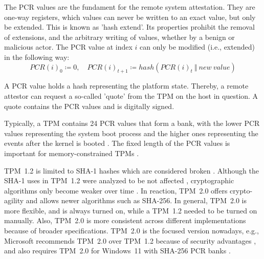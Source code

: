 The \ac{PCR} values are the fundament for the remote system attestation. They are one-way registers, which values can never be written to an exact value, but only be extended.
This is known as 'hash extend'.
Its properties prohibit the removal of extensions, and the arbitrary writing of values, whether by a benign or malicious actor.
The PCR value at index $i$ can only be modified (i.e., extended) in the following way:
\[ PCR(i)_0 \coloneqq 0,\quad PCR(i)_{t+1} \coloneqq hash(PCR(i)_t\ \Vert\ new\ value)\]

A PCR value holds a hash representing the platform state.
Thereby, a remote attestor can request a so-called 'quote' from the TPM on the host in question.
A quote contains the PCR values and is digitally signed.

Typically, a TPM contains 24 PCR values that form a bank, with the lower PCR values representing the system boot process and the higher ones representing the events after the kernel is booted \cite{Arthur2015}.
The fixed length of the \ac{PCR} values is important for memory-constrained TPMs \cite{Arthur2015}.

%


TPM~1.2 is limited to SHA-1 hashes which are considered broken \cite{cryptoeprint:2005/010, Wang2005, Stevens2017}. Although the SHA-1 uses in TPM~1.2 were analyzed to be not affected \cite{sha1tpm12}, cryptographic algorithms only become weaker over time \cite{Arthur2015}. In reaction, TPM~2.0 offers crypto-agility and allows newer algorithms such as SHA-256. In general, TPM~2.0 is more flexible, and is always turned on, while a TPM~1.2 needed to be turned on manually. Also, TPM~2.0 is more consistent across different implementations because of broader specifications.
TPM~2.0 is the focused version nowadays, e.g., Microsoft recommends TPM~2.0 over TPM~1.2 because of security advantages \cite{micrec}, and also requires TPM~2.0 for Windows~11 with SHA-256 PCR banks \cite{win11req}.


